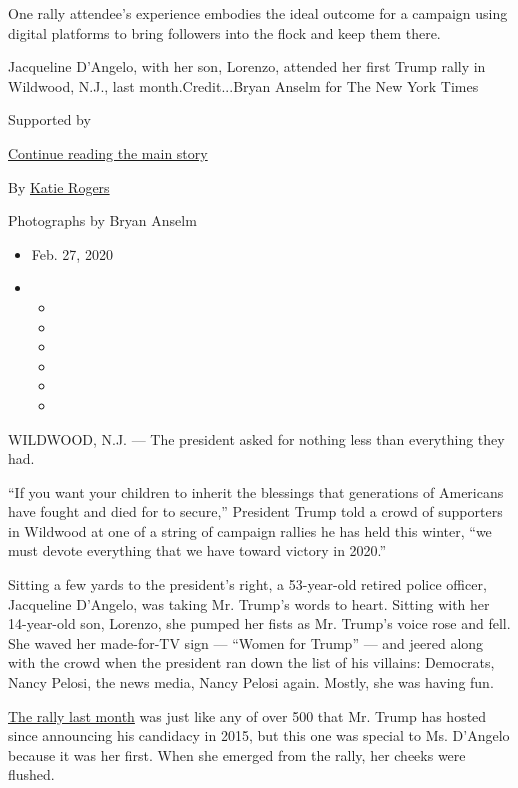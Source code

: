 One rally attendee's experience embodies the ideal outcome for a
campaign using digital platforms to bring followers into the flock and
keep them there.

Jacqueline D'Angelo, with her son, Lorenzo, attended her first Trump
rally in Wildwood, N.J., last month.Credit...Bryan Anselm for The New
York Times

Supported by

\protect\hyperlink{after-sponsor}{Continue reading the main story}

By \href{https://www.nytimes3xbfgragh.onion/by/katie-rogers}{Katie
Rogers}

Photographs by Bryan Anselm

\begin{itemize}
\item
  Feb. 27, 2020
\item
  \begin{itemize}
  \item
  \item
  \item
  \item
  \item
  \item
  \end{itemize}
\end{itemize}

WILDWOOD, N.J. --- The president asked for nothing less than everything
they had.

``If you want your children to inherit the blessings that generations of
Americans have fought and died for to secure,'' President Trump told a
crowd of supporters in Wildwood at one of a string of campaign rallies
he has held this winter, ``we must devote everything that we have toward
victory in 2020.''

Sitting a few yards to the president's right, a 53-year-old retired
police officer, Jacqueline D'Angelo, was taking Mr. Trump's words to
heart. Sitting with her 14-year-old son, Lorenzo, she pumped her fists
as Mr. Trump's voice rose and fell. She waved her made-for-TV sign ---
``Women for Trump'' --- and jeered along with the crowd when the
president ran down the list of his villains: Democrats, Nancy Pelosi,
the news media, Nancy Pelosi again. Mostly, she was having fun.

\href{https://www.nytimes3xbfgragh.onion/2020/01/28/us/politics/trump-new-jersey-rally.html}{The
rally last month} was just like any of over 500 that Mr. Trump has
hosted since announcing his candidacy in 2015, but this one was special
to Ms. D'Angelo because it was her first. When she emerged from the
rally, her cheeks were flushed.


